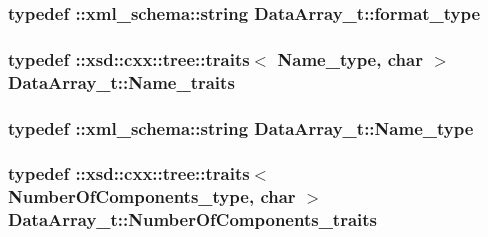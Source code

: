 \subsubsection[{\texorpdfstring{format\+\_\+type}{format_type}}]{\setlength{\rightskip}{0pt plus 5cm}typedef \+::{\bf xml\+\_\+schema\+::string} {\bf Data\+Array\+\_\+t\+::format\+\_\+type}}\hypertarget{classDataArray__t_ae453ea653980baef2e3296005d70bfbd}{}\label{classDataArray__t_ae453ea653980baef2e3296005d70bfbd}
\subsubsection[{\texorpdfstring{Name\+\_\+traits}{Name_traits}}]{\setlength{\rightskip}{0pt plus 5cm}typedef \+::xsd\+::cxx\+::tree\+::traits$<$ {\bf Name\+\_\+type}, char $>$ {\bf Data\+Array\+\_\+t\+::\+Name\+\_\+traits}}\hypertarget{classDataArray__t_a46d0b4cf44ee9122e4cbb3bd3abe6663}{}\label{classDataArray__t_a46d0b4cf44ee9122e4cbb3bd3abe6663}
\subsubsection[{\texorpdfstring{Name\+\_\+type}{Name_type}}]{\setlength{\rightskip}{0pt plus 5cm}typedef \+::{\bf xml\+\_\+schema\+::string} {\bf Data\+Array\+\_\+t\+::\+Name\+\_\+type}}\hypertarget{classDataArray__t_afc6836923916c2489f91caea78ec4ad6}{}\label{classDataArray__t_afc6836923916c2489f91caea78ec4ad6}
\subsubsection[{\texorpdfstring{Number\+Of\+Components\+\_\+traits}{NumberOfComponents_traits}}]{\setlength{\rightskip}{0pt plus 5cm}typedef \+::xsd\+::cxx\+::tree\+::traits$<$ {\bf Number\+Of\+Components\+\_\+type}, char $>$ {\bf Data\+Array\+\_\+t\+::\+Number\+Of\+Components\+\_\+traits}}\hypertarget{classDataArray__t_a1112148f87db2c0ba05323377d9f0427}{}\label{classDataArray__t_a1112148f87db2c0ba05323377d9f0427}
